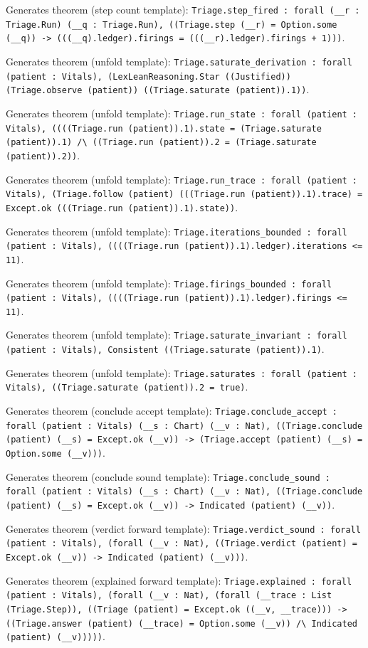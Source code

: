\documentclass[11pt]{article}
\begin{document}
\noindent Generates theorem (step count template): \texttt{Triage.step\_fired : forall (\_\_r : Triage.Run) (\_\_q : Triage.Run), ((Triage.step (\_\_r) = Option.some (\_\_q)) -> (((\_\_q).ledger).firings = (((\_\_r).ledger).firings + 1)))}.\par
\noindent Generates theorem (unfold template): \texttt{Triage.saturate\_derivation : forall (patient : Vitals), (LexLeanReasoning.Star ((Justified)) (Triage.observe (patient)) ((Triage.saturate (patient)).1))}.\par
\noindent Generates theorem (unfold template): \texttt{Triage.run\_state : forall (patient : Vitals), ((((Triage.run (patient)).1).state = (Triage.saturate (patient)).1) /\textbackslash{} ((Triage.run (patient)).2 = (Triage.saturate (patient)).2))}.\par
\noindent Generates theorem (unfold template): \texttt{Triage.run\_trace : forall (patient : Vitals), (Triage.follow (patient) (((Triage.run (patient)).1).trace) = Except.ok (((Triage.run (patient)).1).state))}.\par
\noindent Generates theorem (unfold template): \texttt{Triage.iterations\_bounded : forall (patient : Vitals), ((((Triage.run (patient)).1).ledger).iterations <= 11)}.\par
\noindent Generates theorem (unfold template): \texttt{Triage.firings\_bounded : forall (patient : Vitals), ((((Triage.run (patient)).1).ledger).firings <= 11)}.\par
\noindent Generates theorem (unfold template): \texttt{Triage.saturate\_invariant : forall (patient : Vitals), Consistent ((Triage.saturate (patient)).1)}.\par
\noindent Generates theorem (unfold template): \texttt{Triage.saturates : forall (patient : Vitals), ((Triage.saturate (patient)).2 = true)}.\par
\noindent Generates theorem (conclude accept template): \texttt{Triage.conclude\_accept : forall (patient : Vitals) (\_\_s : Chart) (\_\_v : Nat), ((Triage.conclude (patient) (\_\_s) = Except.ok (\_\_v)) -> (Triage.accept (patient) (\_\_s) = Option.some (\_\_v)))}.\par
\noindent Generates theorem (conclude sound template): \texttt{Triage.conclude\_sound : forall (patient : Vitals) (\_\_s : Chart) (\_\_v : Nat), ((Triage.conclude (patient) (\_\_s) = Except.ok (\_\_v)) -> Indicated (patient) (\_\_v))}.\par
\noindent Generates theorem (verdict forward template): \texttt{Triage.verdict\_sound : forall (patient : Vitals), (forall (\_\_v : Nat), ((Triage.verdict (patient) = Except.ok (\_\_v)) -> Indicated (patient) (\_\_v)))}.\par
\noindent Generates theorem (explained forward template): \texttt{Triage.explained : forall (patient : Vitals), (forall (\_\_v : Nat), (forall (\_\_trace : List (Triage.Step)), ((Triage (patient) = Except.ok ((\_\_v, \_\_trace))) -> ((Triage.answer (patient) (\_\_trace) = Option.some (\_\_v)) /\textbackslash{} Indicated (patient) (\_\_v)))))}.\par
\end{document}
